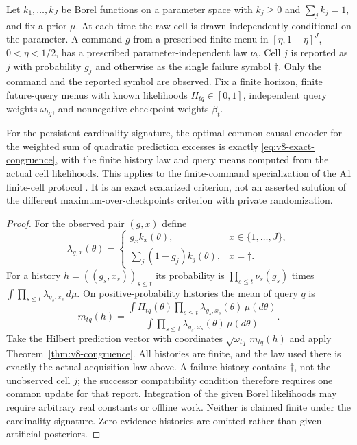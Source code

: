 \begin{corollary}
\label{cor:v8-a1}
Let $k_1,\ldots,k_J$ be Borel functions on a parameter space with
$k_j\ge0$ and $\sum_jk_j=1$, and fix a prior $\mu$. At each time the
raw cell is drawn independently conditional on the parameter. A command
$g$ from a prescribed finite menu in $[\eta,1-\eta]^J$, $0<\eta<1/2$,
has a prescribed parameter-independent law $\nu_t$. Cell $j$ is
reported as $j$ with probability $g_j$ and otherwise as the single
failure symbol $\dagger$. Only the command and the reported symbol are
observed. Fix a finite horizon, finite future-query menus with known
likelihoods $H_{tq}\in[0,1]$, independent query weights $\omega_{tq}$,
and nonnegative checkpoint weights $\beta_t$.

For the persistent-cardinality signature, the optimal common causal
encoder for the weighted sum of quadratic prediction excesses is exactly
\eqref{eq:v8-exact-congruence}, with the finite history law and query
means computed from the actual cell likelihoods. This applies to the
finite-command specialization of the A1 finite-cell protocol
\cite{QiA1v37}. It is an exact scalarized criterion, not an asserted
solution of the different maximum-over-checkpoints criterion with
private randomization.
\end{corollary}
\begin{proof}
For the observed pair $(g,x)$ define
\[
 \lambda_{g,x}(\theta)=
 \begin{cases}
 g_x k_x(\theta),&x\in\{1,\ldots,J\},\\
 \sum_j(1-g_j)k_j(\theta),&x=\dagger.
 \end{cases}
\]
For a history $h=((g_s,x_s))_{s\le t}$ its probability is
$\prod_{s\le t}\nu_s(g_s)$ times
$\int\prod_{s\le t}\lambda_{g_s,x_s}\,d\mu$. On positive-probability
histories the mean of query $q$ is
\[
 m_{tq}(h)=
 \frac{\int H_{tq}(\theta)\prod_{s\le t}\lambda_{g_s,x_s}(\theta)
                    \,\mu(d\theta)}
      {\int\prod_{s\le t}\lambda_{g_s,x_s}(\theta)\,\mu(d\theta)}.
\]
Take the Hilbert prediction vector with coordinates
$\sqrt{\omega_{tq}}\,m_{tq}(h)$ and apply
Theorem~\ref{thm:v8-congruence}. All histories are finite, and the law
used there is exactly the actual acquisition law above. A failure
history contains $\dagger$, not the unobserved cell $j$; the successor
compatibility condition therefore requires one common update for that
report. Integration of the given Borel likelihoods may require arbitrary
real constants or offline work. Neither is claimed finite under the
cardinality signature. Zero-evidence histories are omitted rather than
given artificial posteriors.
\end{proof}

